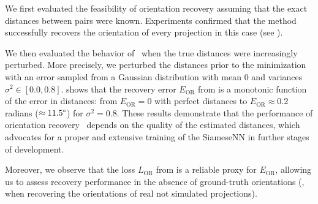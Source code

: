 We first evaluated the feasibility of orientation recovery assuming that the exact distances between pairs were known.
Experiments confirmed that the method successfully recovers the orientation of every projection in this case (see ).

We then evaluated the behavior of~ when the true distances were increasingly perturbed.
More precisely, we perturbed the distances prior to the minimization with an error sampled from a Gaussian distribution with mean $0$ and variances $\sigma^2 \in [0.0, 0.8]$.
 shows that the recovery error $E_\text{OR}$ from  is a monotonic function of the error in distances: from $E_\text{OR} = 0$ with perfect distances to $E_\text{OR} \approx 0.2$ radians ($\approx 11.5\degree$) for $\sigma^2 = 0.8$.
These results demonstrate that the performance of orientation recovery~ depends on the quality of the estimated distances, which advocates for a proper and extensive training of the SiameseNN in further stages of development.

Moreover, we observe that the loss $L_\text{OR}$ from  is a reliable proxy for $E_\text{OR}$, allowing us to assess recovery performance in the absence of ground-truth orientations (\ie, when recovering the orientations of real not simulated projections).

